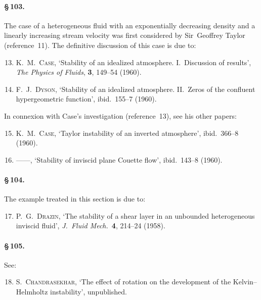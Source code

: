 \paragraph{\S\,103.}
The case of a heterogeneous fluid with an exponentially decreasing density
and a linearly increasing stream velocity was first considered by Sir~Geoffrey
Taylor (reference~11). The definitive discussion of this case is due to:

\begin{enumerate}\setcounter{enumi}{12}
\item K.~M.~\textsc{Case}, `Stability of an idealized atmosphere.
  I.~Discussion of results',
  \emph{The Physics of Fluids}, \textbf{3}, 149--54 (1960).

\item F.~J.~\textsc{Dyson}, `Stability of an idealized atmosphere.
  II.~Zeros of the confluent hypergeometric function',
  ibid.\ 155--7 (1960).
\end{enumerate}

\noindent
In connexion with Case's investigation (reference~13), see his other papers:

\begin{enumerate}\setcounter{enumi}{14}
\item K.~M.~\textsc{Case}, `Taylor instability of an inverted atmosphere',
  ibid.\ 366--8 (1960).

\item ------,
  `Stability of inviscid plane Couette flow', ibid.\ 143--8 (1960).
\end{enumerate}

\paragraph{\S\,104.}
The example treated in this section is due to:

\begin{enumerate}\setcounter{enumi}{16}
\item P.~G.~\textsc{Drazin}, `The stability of a shear layer in an unbounded
  heterogeneous inviscid fluid',
  \emph{J.\ Fluid Mech.}\ \textbf{4}, 214--24 (1958).
\end{enumerate}

\paragraph{\S\,105.} See:

\begin{enumerate}\setcounter{enumi}{17}
\item S.~\textsc{Chandrasekhar}, `The effect of rotation on the development of
  the Kelvin--Helmholtz instability', unpublished.
\end{enumerate}

